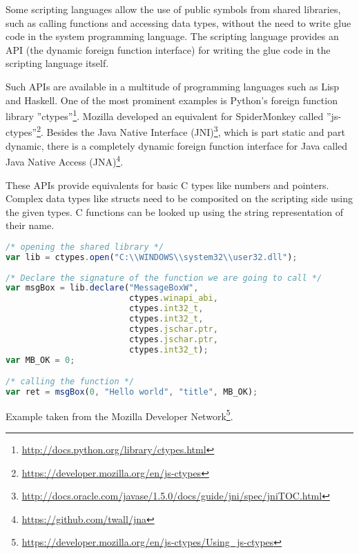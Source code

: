 Some scripting languages allow the use of public symbols from shared libraries, such as calling functions and accessing data types, without the need to write glue code in the system programming language. The scripting language provides an API (the dynamic foreign function interface) for writing the glue code in the scripting language itself.

Such APIs are available in a multitude of programming languages such as Lisp and Haskell. One of the most prominent examples is Python's foreign function library ''ctypes''\footnote{\url{http://docs.python.org/library/ctypes.html}}. Mozilla developed an equivalent for SpiderMonkey called ''js-ctypes''\footnote{\url{https://developer.mozilla.org/en/js-ctypes}}. Besides the Java Native Interface (JNI)\footnote{\url{http://docs.oracle.com/javase/1.5.0/docs/guide/jni/spec/jniTOC.html}}, which is part static and part dynamic, there is a completely dynamic foreign function interface for Java called Java Native Access (JNA)\footnote{\url{https://github.com/twall/jna}}.

These APIs provide equivalents for basic C types like numbers and pointers. Complex data types like structs need to be composited on the scripting side using the given types. C functions can be looked up using the string representation of their name.

\SingleSpacing
\begin{lstlisting}[language=JavaScript, caption={Exposing a C function to JavaScript using js-ctypes}]
/* opening the shared library */
var lib = ctypes.open("C:\\WINDOWS\\system32\\user32.dll");  
  
/* Declare the signature of the function we are going to call */  
var msgBox = lib.declare("MessageBoxW",  
                         ctypes.winapi_abi,  
                         ctypes.int32_t,  
                         ctypes.int32_t,  
                         ctypes.jschar.ptr,  
                         ctypes.jschar.ptr,  
                         ctypes.int32_t);  
var MB_OK = 0;  

/* calling the function */
var ret = msgBox(0, "Hello world", "title", MB_OK); 
\end{lstlisting}
\OnehalfSpacing

Example taken from the Mozilla Developer Network\footnote{\url{https://developer.mozilla.org/en/js-ctypes/Using_js-ctypes}}.

